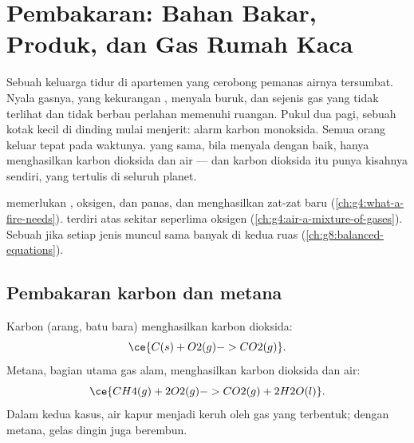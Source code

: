 \chapter{Pembakaran: Bahan Bakar, Produk, dan Gas Rumah Kaca}\label{ch:g8:combustion-and-fuels}

Sebuah keluarga tidur di apartemen yang cerobong pemanas airnya
tersumbat. Nyala gasnya, yang kekurangan , menyala buruk, dan
sejenis gas yang tidak terlihat dan tidak berbau perlahan memenuhi
ruangan. Pukul dua pagi, sebuah kotak kecil di dinding mulai menjerit:
alarm karbon monoksida. Semua orang keluar tepat pada waktunya.  yang sama, bila menyala dengan baik, hanya menghasilkan karbon
dioksida dan air --- dan karbon dioksida itu punya kisahnya sendiri,
yang tertulis di  seluruh planet.

\begin{recall}
 memerlukan , oksigen, dan panas, dan menghasilkan
zat-zat baru (\cref{ch:g4:what-a-fire-needs}).  terdiri atas
sekitar seperlima oksigen (\cref{ch:g4:air-a-mixture-of-gases}).
Sebuah  jika setiap jenis  muncul sama banyak di
kedua ruas (\cref{ch:g8:balanced-equations}).
\end{recall}

\section{Pembakaran karbon dan metana}

\begin{example}\label{ex:g8:combustion-and-fuels:two}
Karbon (arang, batu bara)  menghasilkan karbon dioksida:
\[
  \ce{C(s) + O2(g) -> CO2(g)}.
\]
Metana, bagian utama gas alam,  menghasilkan karbon dioksida dan
air:
\[
  \ce{CH4(g) + 2O2(g) -> CO2(g) + 2H2O(l)}.
\]
Dalam kedua kasus, air kapur menjadi keruh oleh gas yang terbentuk;
dengan metana, gelas dingin juga berembun.
\end{example}

